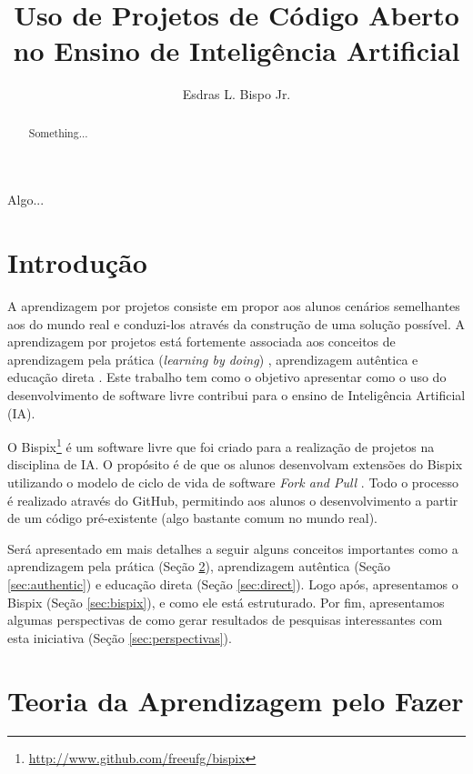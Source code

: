 \documentclass[12pt]{article}
\title{Uso de Projetos de Código Aberto 
	\\no Ensino de Inteligência Artificial}
\author{Esdras L. Bispo Jr.\inst{1} }
\begin{document}
 

\maketitle

\begin{abstract}
  Something...
\end{abstract}
     
\begin{resumo} 
  Algo...
\end{resumo}


\section{Introdução}

A aprendizagem por projetos consiste em propor aos alunos cenários semelhantes aos do mundo real e conduzi-los através da construção de uma solução possível. A aprendizagem por projetos está fortemente associada aos conceitos de aprendizagem pela prática ({\it learning by doing}) \cite{anzai:1979, schank:1999, benssen:2015}, aprendizagem autêntica \cite{herrington:2000, herrington:2006, lombardi:2007} e educação direta \cite{lakey:2010}. Este trabalho tem como o objetivo apresentar como o uso do desenvolvimento de software livre contribui para o ensino de Inteligência Artificial (IA).

O Bispix\footnote{\url{http://www.github.com/freeufg/bispix}} é um software livre que foi criado para a realização de projetos na disciplina de IA. O propósito é de que os alunos desenvolvam extensões do Bispix utilizando o modelo de ciclo de vida de software {\it Fork and Pull} \cite{alasbali:2015, buffardi:2015}. Todo o processo é realizado através do GitHub,  permitindo aos alunos o desenvolvimento a partir de um código pré-existente (algo bastante comum no mundo real).

Será apresentado em mais detalhes a seguir alguns conceitos importantes como a aprendizagem pela prática (Seção \ref{sec:doing}), aprendizagem autêntica (Seção \ref{sec:authentic}) e educação direta (Seção \ref{sec:direct}). Logo após, apresentamos o Bispix (Seção \ref{sec:bispix}), e como ele está estruturado. Por fim, apresentamos algumas perspectivas de como gerar resultados de pesquisas interessantes com esta iniciativa (Seção \ref{sec:perspectivas}).

\section{Teoria da Aprendizagem pelo Fazer} \label{sec:doing}
\end{document}
